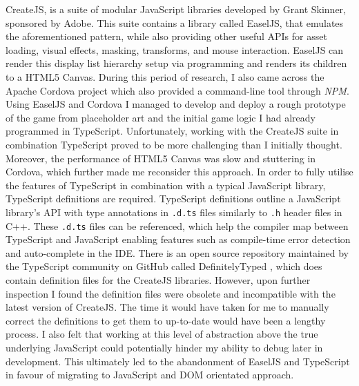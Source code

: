 \documentclass[final]{cmpreport}
\begin{document}
CreateJS, is a suite of modular JavaScript libraries developed by Grant Skinner, sponsored by Adobe. This suite contains a library called EaselJS, that emulates the aforementioned pattern, while also providing other useful APIs for asset loading, visual effects, masking, transforms, and mouse interaction. EaselJS can render this display list hierarchy setup via programming and renders its children to a HTML5 Canvas. During this period of research, I also came across the Apache Cordova project which also provided a command-line tool through \textit{NPM}. Using EaselJS and Cordova I managed to develop and deploy a rough prototype of the game from placeholder art and the initial game logic I had already programmed in TypeScript. Unfortunately, working with the CreateJS suite in combination TypeScript proved to be more challenging than I initially thought. Moreover, the performance of HTML5 Canvas was slow and stuttering in Cordova, which further made me reconsider this approach. In order to fully utilise the features of TypeScript in combination with a typical JavaScript library, TypeScript definitions are required. TypeScript definitions outline a JavaScript library's API with type annotations in \texttt{.d.ts} files similarly to \texttt{.h} header files in C++. These \texttt{.d.ts} files can be referenced, which help the compiler map between TypeScript and JavaScript enabling features such as compile-time error detection and auto-complete in the IDE. There is an open source repository maintained by the TypeScript community on GitHub called DefinitelyTyped \footnotemark , which does contain definition files for the CreateJS libraries. However, upon further inspection I found the definition files were obsolete and incompatible with the latest version of CreateJS. The time it would have taken for me to manually correct the definitions to get them to up-to-date would have been a lengthy process. I also felt that working at this level of abstraction above the true underlying JavaScript could potentially hinder my ability to debug later in development. This ultimately led to the abandonment of EaselJS and TypeScript in favour of migrating to JavaScript and DOM orientated approach.
\end{document}
